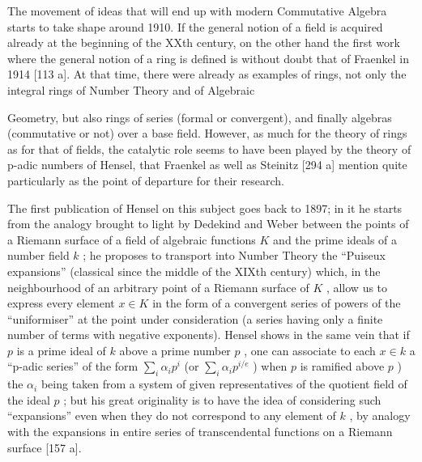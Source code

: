 The movement of ideas that will end up with modern Commutative Algebra starts to take shape around 1910. If the general notion of a field is acquired already at the beginning of the XXth century, on the other hand the first work where the general notion of a ring is defined is without doubt that of Fraenkel in 1914 {[}113 a{]}. At that time, there were already as examples of rings, not only the integral rings of Number Theory and of Algebraic

Geometry, but also rings of series (formal or convergent), and finally algebras (commutative or not) over a base field. However, as much for the theory of rings as for that of fields, the catalytic role seems to have been played by the theory of p-adic numbers of Hensel, that Fraenkel as well as Steinitz {[}294 a{]} mention quite particularly as the point of departure for their research.

The first publication of Hensel on this subject goes back to 1897; in it he starts from the analogy brought to light by Dedekind and Weber between the points of a Riemann surface of a field of algebraic functions \(K\) and the prime ideals of a number field \(k\) ; he proposes to transport into Number Theory the ``Puiseux expansions'' (classical since the middle of the XIXth century) which, in the neighbourhood of an arbitrary point of a Riemann surface of \(K\) , allow us to express every element \(x \in K\) in the form of a convergent series of powers of the ``uniformiser'' at the point under consideration (a series having only a finite number of terms with negative exponents). Hensel shows in the same vein that if \(p\) is a prime ideal of \(k\) above a prime number \(p\) , one can associate to each \(x \in k\) a ``p-adic series'' of the form \(\sum_{i} \alpha_{i} p^{i}\) (or \(\sum_{i} \alpha_{i} p^{i/e}\) ) when \(p\) is ramified above \(p\) ) the \(\alpha_{i}\) being taken from a system of given representatives of the quotient field of the ideal \(p\) ; but his great originality is to have the idea of considering such ``expansions'' even when they do not correspond to any element of \(k\) , by analogy with the expansions in entire series of transcendental functions on a Riemann surface {[}157 a{]}.

